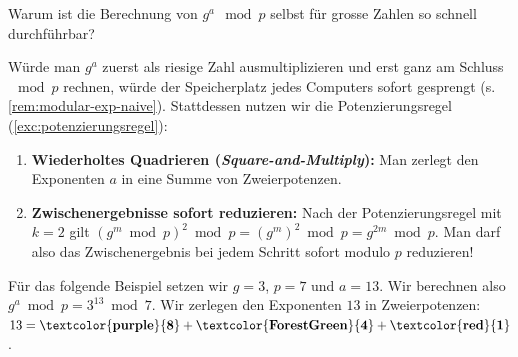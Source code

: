 \newpage
\begin{myexample}
	Warum ist die Berechnung von $g^a \mod p$ selbst für grosse Zahlen so schnell durchführbar?

	Würde man $g^a$ zuerst als riesige Zahl ausmultiplizieren und erst ganz am Schluss $\mod p$ rechnen, würde der Speicherplatz jedes Computers sofort gesprengt (s. \cref{rem:modular-exp-naive}). Stattdessen nutzen wir die Potenzierungsregel (\cref{exc:potenzierungsregel}):
	\begin{enumerate}
		\item \textbf{Wiederholtes Quadrieren (\emph{Square-and-Multiply}):} Man zerlegt den Exponenten $a$ in eine Summe von Zweierpotenzen.
		\item \textbf{Zwischenergebnisse sofort reduzieren:} Nach der Potenzierungsregel mit $k=2$ gilt $(g^m \bmod p)^2 \bmod p = (g^m)^2 \bmod p = g^{2m} \bmod p$. Man darf also das Zwischenergebnis bei jedem Schritt sofort modulo $p$ reduzieren!
	\end{enumerate}

	Für das folgende Beispiel setzen wir $g=3$, $p=7$ und $a=13$. Wir berechnen also $g^a \bmod p = 3^{13} \bmod 7$.
	Wir zerlegen den Exponenten $13$ in Zweierpotenzen: $13 = \mathbf{\textcolor{purple}{8}} + \mathbf{\textcolor{ForestGreen}{4}} + \mathbf{\textcolor{red}{1}}$.


\end{myexample}
